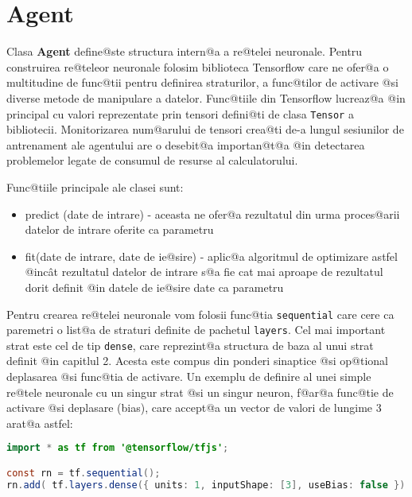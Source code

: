 \section{Agent}
 
Clasa \textbf{Agent} define@ste structura intern@a a re@telei neuronale. Pentru construirea re@teleor neuronale folosim biblioteca Tensorflow care ne ofer@a o multitudine de func@tii pentru definirea straturilor, a func@tilor de activare @si diverse metode de manipulare a datelor. Func@tiile din Tensorflow lucreaz@a @in principal cu valori reprezentate prin tensori defini@ti de clasa \texttt{Tensor} a bibliotecii. Monitorizarea num@arului de tensori crea@ti de-a lungul se\-si\-u\-ni\-lor de antrenament ale agentului are o desebit@a importan@t@a @in detectarea problemelor legate de consumul de resurse al calculatorului.

Func@tiile principale ale clasei sunt:
\begin{itemize}
	\item predict (date de intrare) - aceasta ne ofer@a rezultatul din urma proces@arii datelor de intrare oferite ca parametru
	\item fit(date de intrare, date de ie@sire) - aplic@a algoritmul de optimizare astfel @inc\^ at rezultatul datelor de intrare s@a fie cat mai aproape de rezultatul dorit definit @in datele de ie@sire date ca parametru
\end{itemize}

Pentru crearea re@telei neuronale vom folosii func@tia \texttt{sequential} care cere ca paremetri o list@a de straturi definite de pachetul \texttt{layers}. Cel mai important strat este cel de tip \texttt{dense}, care reprezint@a structura de baza al unui strat definit @in capitlul 2. Acesta este compus din ponderi sinaptice @si op@tional deplasarea @si func@tia de activare. Un exemplu de definire al unei simple re@tele neuronale cu un singur strat @si un singur neuron, f@ar@a func@tie de activare @si deplasare (bias), care accept@a un vector de valori de lungime 3 arat@a astfel:

\begin{lstlisting}[language=Java, caption={Exemplu de creare a unei rețele neuronale simple}]
import * as tf from '@tensorflow/tfjs';

const rn = tf.sequential();
rn.add( tf.layers.dense({ units: 1, inputShape: [3], useBias: false }) );
\end{lstlisting}

